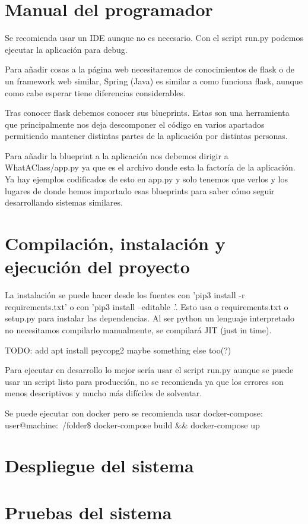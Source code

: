 \section{Manual del programador}

Se recomienda usar un IDE aunque no es necesario. Con el script run.py podemos ejecutar la aplicación para debug. 

Para añadir cosas a la página web necesitaremos de conocimientos de flask o de un framework web similar, Spring (Java) es similar a como funciona flask, aunque como cabe esperar tiene diferencias considerables.

Tras conocer flask debemos conocer sus blueprints. Estas son una herramienta que principalmente nos deja descomponer el código en varios apartados permitiendo mantener distintas partes de la aplicación por distintas personas.

Para añadir la blueprint a la aplicación nos debemos dirigir a WhatAClass/app.py ya que es el archivo donde esta la factoría de la aplicación. Ya hay ejemplos codificados de esto en app.py y solo tenemos que verlos y los lugares de donde hemos importado esas blueprints para saber cómo seguir desarrollando sistemas similares.


 

\section{Compilación, instalación y ejecución del proyecto}

La instalación se puede hacer desde los fuentes con 'pip3 install -r requirements.txt' o con 'pip3 install --editable .'. Esto usa o requirements.txt o setup.py para instalar las dependencias. Al ser python un lenguaje interpretado no necesitamos compilarlo manualmente, se compilará JIT (just in time).

TODO: add apt install psycopg2 maybe something else too(?)

Para ejecutar en desarrollo lo mejor sería usar el script run.py aunque se puede usar un script listo para producción, no se recomienda ya que los errores son menos descriptivos y mucho más difíciles de solventar.

Se puede ejecutar con docker pero se recomienda usar docker-compose:
user@machine:~/folder\$ docker-compose build && docker-compose up 

\section{Despliegue del sistema}

\section{Pruebas del sistema}



